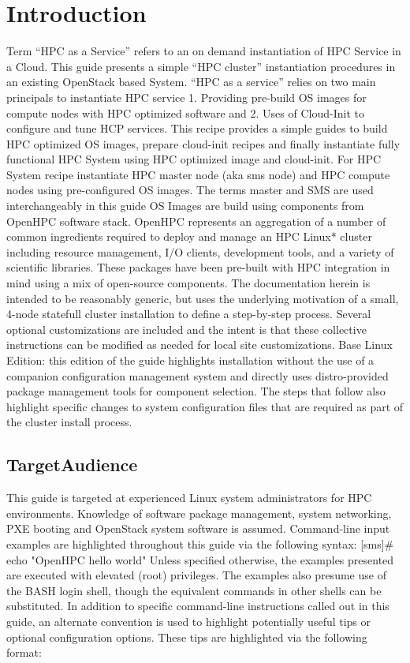 \documentclass[12pt]{article}
\begin{document}
\section*{Introduction}

Term “HPC as a Service” refers to an on demand instantiation of HPC Service in a Cloud. This guide presents a simple “HPC cluster” instantiation procedures in an existing OpenStack based System. “HPC as a service” relies on two main principals to instantiate HPC service 1. Providing pre-build OS images for compute nodes with HPC optimized software and 2. Uses of Cloud-Init to configure and tune HCP services. This recipe provides a simple guides to build HPC optimized OS images, prepare cloud-init recipes and finally instantiate fully functional HPC System using HPC optimized image and cloud-init. For HPC System recipe instantiate HPC master node (aka sms node) and HPC compute nodes using pre-configured OS images. The terms master and SMS are used interchangeably in this guide
OS Images are build using components from OpenHPC software stack. OpenHPC represents an aggregation of a number of common ingredients required to deploy and manage an HPC Linux* cluster including resource management, I/O clients, development tools, and a variety of scientific libraries. These packages have been pre-built with HPC integration in mind using a mix of open-source components. The documentation herein is intended to be reasonably generic,
but uses the underlying motivation of a small, 4-node statefull cluster installation to define a step-by-step
process. Several optional customizations are included and the intent is that these collective instructions can
be modified as needed for local site customizations.
Base Linux Edition: this edition of the guide highlights installation without the use of a companion configuration management system and directly uses distro-provided package management tools for component selection. The steps that follow also highlight specific changes to system configuration files that are required as part of the cluster install process.


\subsection*{TargetAudience}
This guide is targeted at experienced Linux system administrators for HPC environments. Knowledge of
software package management, system networking, PXE booting and OpenStack system software is assumed. Command-line input examples are highlighted throughout this guide via the following syntax:
[sms]# echo "OpenHPC hello world"
Unless specified otherwise, the examples presented are executed with elevated (root) privileges. The
examples also presume use of the BASH login shell, though the equivalent commands in other shells can
be substituted. In addition to specific command-line instructions called out in this guide, an alternate
convention is used to highlight potentially useful tips or optional configuration options. These tips are
highlighted via the following format:
\end{document}

